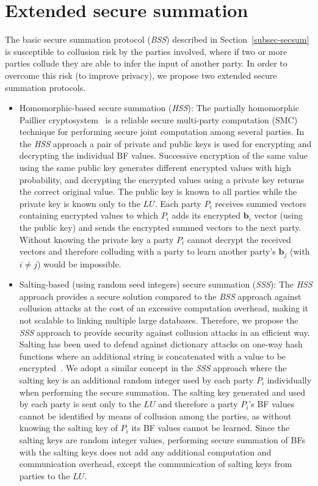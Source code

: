 \documentclass{sig-alternate}
\begin{document}
\section{Extended secure summation}
\label{sec-ext-secsum}

The basic secure summation protocol (\emph{BSS}) described
in Section~\ref{subsec-secsum} is susceptible
to collusion risk by the parties involved, where if two or more parties
collude they are able to infer the input of another
party. In order to overcome this risk (to improve privacy), we propose
two extended secure summation protocols.

\begin{itemize}

\item Homomorphic-based secure summation (\emph{HSS}):
The partially homomorphic Paillier cryptosystem~\cite{Pai99}
is a reliable secure multi-party computation (SMC) technique
for performing secure joint computation among several parties.
In the \emph{HSS} approach a pair of private and public keys is used
for encrypting and decrypting the individual BF values.
Successive encryption of the same value using the same public key
generates different encrypted values with high probability, 
and decrypting the encrypted values using a private key returns
the correct original value.
The public key is known to all parties while the private key is
known only to the $LU$. Each party $P_i$ receives
summed vectors containing encrypted values to which $P_i$ adds 
its encrypted $\mathbf{b}_i$ vector (using the public key) and sends the
encrypted summed vectors to the next party. Without knowing the private key
a party $P_i$ cannot decrypt the received vectors and therefore 
colluding with a party to learn another party's $\mathbf{b}_j$ (with $i \neq j$)
would be impossible.

\item Salting-based (using random seed integers) secure summation (\emph{SSS}):
The \emph{HSS} approach provides a secure solution 
compared to the \emph{BSS} approach
against collusion attacks at the cost of 
an excessive computation overhead, 
making it not scalable to linking multiple large databases.
Therefore, we propose the \emph{SSS} approach 
to provide security against collusion attacks in an efficient way.
Salting has been used to defend against dictionary attacks
on one-way hash functions where an additional string 
is concatenated with
a value to be encrypted~\cite{Sch15}.
We adopt a similar concept in the \emph{SSS} approach where the salting key is
an additional random integer used by each party $P_i$ individually 
when performing the secure summation. The salting key generated and 
used by each party is sent only
to the $LU$ and therefore a party $P_i$'s BF values cannot be identified
by means of collusion among the parties, as without knowing the salting
key of $P_i$ its BF values cannot be learned.
Since the salting keys are random integer values, performing secure summation
of BFs with the salting keys does not add any additional 
computation and communication overhead, except the communication of
salting keys from parties to the $LU$.


\end{itemize}
\end{document}
